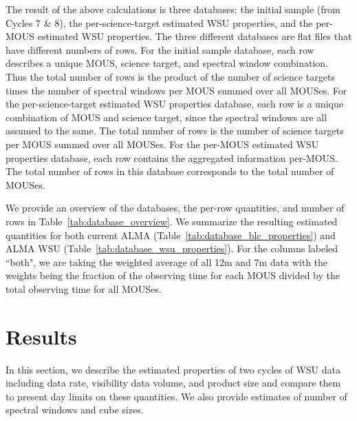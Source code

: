 \documentclass[preprint]{aastex631}
\begin{document}




The result of the above calculations is three databases: the initial sample (from Cycles 7 \& 8), the per-science-target estimated WSU properties, and the per-MOUS estimated WSU properties. The three different databases are flat files that have different numbers of rows. For the initial sample database, each row describes a unique MOUS, science target, and spectral window combination. Thus the total number of rows is the product of the number of science targets times the number of spectral windows per MOUS summed over all MOUSes. For the per-science-target estimated WSU properties database, each row is a unique combination of MOUS and science target, since the spectral windows are all assumed to the same. The total number of rows is the number of science targets per MOUS summed over all MOUSes. For the per-MOUS estimated WSU properties database, each row contains the aggregated information per-MOUS. The total number of rows in this database corresponds to the total number of MOUSes.

We provide an overview of the databases, the per-row quantities, and number of rows in Table~\ref{tab:database_overview}. We summarize  the resulting estimated quantities for both current ALMA (Table~\ref{tab:database_blc_properties}) and  ALMA WSU (Table~\ref{tab:database_wsu_properties}).  For the columns labeled ``both", we are taking the weighted average of all 12m and 7m data with the weights being the fraction of the observing time for each MOUS divided by the total observing time for all MOUSes.



\clearpage




\clearpage



\clearpage



\section{Results} \label{sec:results}

In this section, we describe the estimated properties of two cycles of WSU data including data rate, visibility data volume, and product size and compare them to present day limits on these quantities. We also provide estimates of number of spectral windows and cube sizes.
\end{document}
